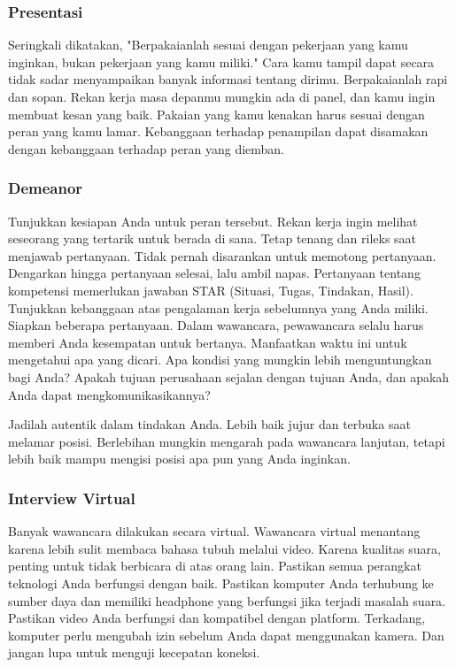 \documentclass{article}
\begin{document}
\subsubsection{Presentasi}
Seringkali dikatakan, "Berpakaianlah sesuai dengan pekerjaan yang kamu inginkan, bukan pekerjaan yang kamu miliki." Cara kamu tampil dapat secara tidak sadar menyampaikan banyak informasi tentang dirimu. Berpakaianlah rapi dan sopan. Rekan kerja masa depanmu mungkin ada di panel, dan kamu ingin membuat kesan yang baik. Pakaian yang kamu kenakan harus sesuai dengan peran yang kamu lamar. Kebanggaan terhadap penampilan dapat disamakan dengan kebanggaan terhadap peran yang diemban.

\subsubsection{Demeanor}
Tunjukkan kesiapan Anda untuk peran tersebut. Rekan kerja ingin melihat seseorang yang tertarik untuk berada di sana. Tetap tenang dan rileks saat menjawab pertanyaan. Tidak pernah disarankan untuk memotong pertanyaan. Dengarkan hingga pertanyaan selesai, lalu ambil napas. Pertanyaan tentang kompetensi memerlukan jawaban STAR (Situasi, Tugas, Tindakan, Hasil). Tunjukkan kebanggaan atas pengalaman kerja sebelumnya yang Anda miliki. Siapkan beberapa pertanyaan. Dalam wawancara, pewawancara selalu harus memberi Anda kesempatan untuk bertanya. Manfaatkan waktu ini untuk mengetahui apa yang dicari. Apa kondisi yang mungkin lebih menguntungkan bagi Anda? Apakah tujuan perusahaan sejalan dengan tujuan Anda, dan apakah Anda dapat mengkomunikasikannya?

Jadilah autentik dalam tindakan Anda. Lebih baik jujur dan terbuka saat melamar posisi. Berlebihan mungkin mengarah pada wawancara lanjutan, tetapi lebih baik mampu mengisi posisi apa pun yang Anda inginkan.

\subsubsection{Interview Virtual}
Banyak wawancara dilakukan secara virtual. Wawancara virtual menantang karena lebih sulit membaca bahasa tubuh melalui video. Karena kualitas suara, penting untuk tidak berbicara di atas orang lain. Pastikan semua perangkat teknologi Anda berfungsi dengan baik. Pastikan komputer Anda terhubung ke sumber daya dan memiliki headphone yang berfungsi jika terjadi masalah suara. Pastikan video Anda berfungsi dan kompatibel dengan platform. Terkadang, komputer perlu mengubah izin sebelum Anda dapat menggunakan kamera. Dan jangan lupa untuk menguji kecepatan koneksi.
\end{document}
